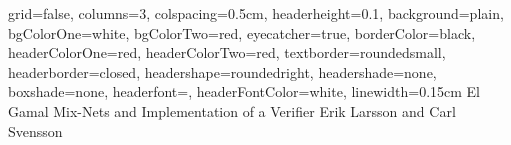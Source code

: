 \documentclass[a0paper,landscape,margin=100pt]{baposter}
\begin{document}
\begin{poster}{
grid=false,
columns=3,
colspacing=0.5cm,
headerheight=0.1\textheight,
background=plain,
bgColorOne=white,
bgColorTwo=red,
eyecatcher=true,
borderColor=black,
headerColorOne=red,
headerColorTwo=red,
textborder=roundedsmall,
headerborder=closed,
headershape=roundedright,
headershade=none,
boxshade=none,
headerfont=\sc,
headerFontColor=white,
linewidth=0.15cm
}
{}
{El Gamal Mix-Nets and Implementation of a Verifier}
{Erik Larsson and Carl Svensson}
{}



\end{poster}
\end{document}
